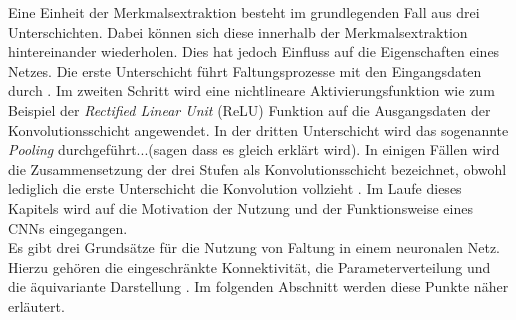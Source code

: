 		
		
	 	
	
		Eine Einheit der Merkmalsextraktion besteht im grundlegenden Fall aus drei Unterschichten. Dabei können sich diese innerhalb der Merkmalsextraktion hintereinander wiederholen. Dies hat jedoch Einfluss auf die Eigenschaften eines Netzes. Die erste Unterschicht führt Faltungsprozesse mit den Eingangsdaten durch \cite{deeplearning}. Im zweiten Schritt wird eine nichtlineare Aktivierungsfunktion wie zum Beispiel der \textit{Rectified Linear Unit} (ReLU) Funktion auf die Ausgangsdaten der Konvolutionsschicht angewendet. In der dritten Unterschicht wird das sogenannte \textit{Pooling} durchgeführt...(sagen dass es gleich erklärt wird). In einigen Fällen wird die Zusammensetzung der drei Stufen als Konvolutionsschicht bezeichnet, obwohl lediglich die erste Unterschicht die Konvolution vollzieht \cite{deeplearning}. Im Laufe dieses Kapitels wird auf die Motivation der Nutzung und der Funktionsweise eines CNNs eingegangen.\\
		
		Es gibt drei Grundsätze für die Nutzung von Faltung in einem neuronalen Netz. Hierzu gehören die eingeschränkte Konnektivität, die Parameterverteilung und die äquivariante Darstellung \cite{deeplearning}. Im folgenden Abschnitt werden diese Punkte näher erläutert.\\
		
